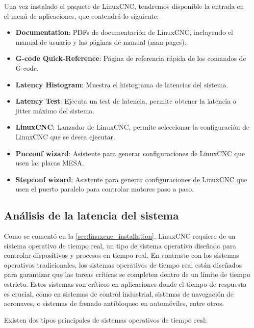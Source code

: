 \documentclass[english,spanish,a4paper,11pt]{article}
\begin{document}
Una vez instalado el paquete de LinuxCNC, tendremos disponible la entrada  en el menú de aplicaciones, que contendrá lo siguiente:
%
\begin{itemize}
    \item \textbf{Documentation}: PDFs de documentación de LinuxCNC, incluyendo el manual de usuario y las páginas de manual (man pages). 
    \item \textbf{G-code Quick-Reference}: Página de referencia rápida de los comandos de G-code.
    \item \textbf{Latency Histogram}: Muestra el histograma de latencias del sistema.
    \item \textbf{Latency Test}: Ejecuta un test de latencia, permite obtener la latencia o jitter máximo del sistema.
    \item \textbf{LinuxCNC}: Lanzador de LinuxCNC, permite seleccionar la configuración de LinuxCNC que se desea ejecutar.
    \item \textbf{Pncconf wizard}: Asistente para generar configuraciones de LinuxCNC que usen las placas MESA.
    \item \textbf{Stepconf wizard}: Asistente para generar configuraciones de LinuxCNC que usen el puerto paralelo para controlar motores paso a paso.
\end{itemize}


\subsection{Análisis de la latencia del sistema}

Como se comentó en la \cref{sec:linuxcnc_installation}, LinuxCNC requiere de un sistema operativo de tiempo real, un tipo de sistema operativo diseñado para controlar dispositivos y procesos en tiempo real. En contraste con los sistemas operativos tradicionales, los sistemas operativos de tiempo real están diseñados para garantizar que las tareas críticas se completen dentro de un límite de tiempo estricto. Estos sistemas son críticos en aplicaciones donde el tiempo de respuesta es crucial, como en sistemas de control industrial, sistemas de navegación de aeronaves, o sistemas de frenado antibloqueo en automóviles, entre otros.

Existen dos tipos principales de sistemas operativos de tiempo real:
\end{document}
